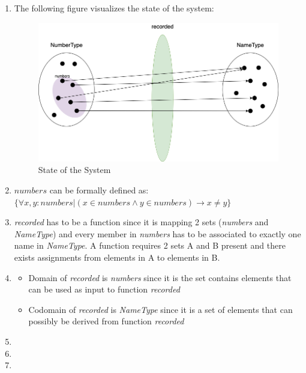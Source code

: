 \begin{enumerate}
    \item The following figure visualizes the state of the system:
        \begin{figure}[h]
        \centering
        \includegraphics[scale=0.45]{images/Diagram.png}
        \caption{State of the System}
        \label{fig:Diagram}
        \end{figure}
    \item $numbers$ can be formally defined as: \\
    $\{ \forall x, y: numbers | (x \in numbers \wedge y \in numbers) \rightarrow x \neq y \}$
\item \emph{recorded} has to be a function since it is mapping 2 sets (\emph{numbers} and \emph{NameType}) and every member in \emph{numbers} has to be associated to exactly one name in \emph{NameType}. A function requires 2 sets A and B present and there exists assignments from elements in A to elements in B.
\item 
    \begin{itemize}
        \item[] Domain of \emph{recorded} is \emph{numbers} since it is the set contains elements that can be used as input to function \emph{recorded}
        \item[] Codomain of \emph{recorded} is \emph{NameType} since it is a set of elements that can possibly be derived from function \emph{recorded}
    \end{itemize}
    \item
    \item
    \item
\end{enumerate}
